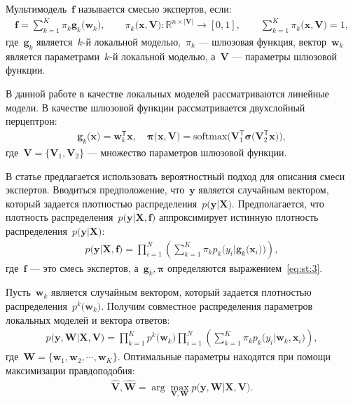 \begin{definition}
\label{def:2}
Мультимодель~$\mathbf{f}$ называется смесью экспертов, если:
\[
\label{eq:st:2}
\begin{aligned}
\mathbf{f} = \sum_{k=1}^{K}\pi_{k}\mathbf{g}_k\bigr(\mathbf{w}_k\bigr), \qquad \pi_{k}\bigr(\mathbf{x}, \mathbf{V}\bigr):\mathbb{R}^{n\times \left|\mathbf{V}\right|} \to [0, 1], \qquad \sum_{k=1}^{K}\pi_{k}\bigr(\mathbf{x}, \mathbf{V}\bigr) = 1,
\end{aligned}
\]
где~$\mathbf{g}_k$ является~$k$-й локальной моделью,~$\pi_k$ --- шлюзовая функция, вектор~$\mathbf{w}_k$ является параметрами~$k$-й локальной моделью, а~$\mathbf{V}$ --- параметры шлюзовой функции.
\end{definition}

В данной работе в качестве локальных моделей рассматриваются линейные модели. В качестве шлюзовой функции рассматривается двухслойный перцептрон:
\[
\label{eq:st:3}
\begin{aligned}
\mathbf{g}_k\bigr(\textbf{x}\bigr) = \textbf{w}_k^{\mathsf{T}}\textbf{x}, \quad
\bm{\pi}\bigr(\mathbf{x}, \mathbf{V}\bigr) = \text{softmax}\bigr(\mathbf{V}_{1}^{\mathsf{T}}\bm{\sigma}\bigr(\mathbf{V}_2^{\mathsf{T}}\mathbf{x}\bigr)\bigr),
\end{aligned}
\]
где~$\mathbf{V} = \bigr\{\mathbf{V}_1, \mathbf{V}_2\bigr\}$ --- множество параметров шлюзовой функции.

В статье предлагается использовать вероятностный подход для описания смеси экспертов. Вводиться предположение, что~$\textbf{y}$ является случайным вектором, который задается плотностью распределения~$p\bigr(\textbf{y}|\textbf{X}\bigr)$. Предполагается, что плотность распределения~$p\bigr(\textbf{y}|\textbf{X}, \textbf{f}\bigr)$ аппроксимирует истинную плотность распределения~$p\bigr(\textbf{y}|\textbf{X}\bigr)$:
\[
\label{eq:st:new:1}
\begin{aligned}
p\bigr(\textbf{y}|\textbf{X}, \textbf{f}\bigr) = \prod_{i=1}^{N}\left(\sum_{k=1}^{K}\pi_kp_{k}\bigr(y_{i}|\textbf{g}_{k}\bigr(\mathbf{x}_{i}\bigr)\bigr)\right),
\end{aligned}
\]
где~$\textbf{f}$ --- это смесь экспертов, а~$\textbf{g}_k, \bm{\pi}$ определяются выражением~\eqref{eq:st:3}.

Пусть~$\textbf{w}_k$ является случайным вектором, который задается плотностью распределения~$p^{k}\bigr(\mathbf{w}_k\bigr)$. Получим совместное распределения параметров локальных моделей и вектора ответов:
\[
\label{eq:st:4}
\begin{aligned}
p\bigr(\mathbf{y}, \mathbf{W}|\mathbf{X}, \mathbf{V}\bigr) = \prod_{k=1}^{K}p^{k}\bigr(\mathbf{w}_k\bigr)\prod_{i=1}^{N}\left(\sum_{k=1}^{K}\pi_{k}p_{k}\bigr(y_i|\mathbf{w}_k, \mathbf{x}_i\bigr)\right),
\end{aligned}
\]
где~$\mathbf{W} = \bigr\{\mathbf{w}_1, \mathbf{w}_2, \cdots, \mathbf{w}_K\bigr\}.$
Оптимальные параметры находятся при помощи максимизации правдоподобия:
\[
\label{eq:st:5}
\begin{aligned}
\hat{\mathbf{V}}, \hat{ \mathbf{W}} = \arg\max_{\mathbf{V}, \mathbf{W}} p\bigr(\mathbf{y},  \mathbf{W}|\mathbf{X}, \mathbf{V}\bigr).
\end{aligned}
\]

